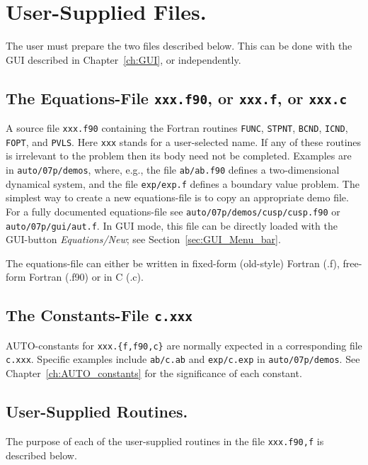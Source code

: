 \documentclass[12pt]{report}
\begin{document}
\chapter{ User-Supplied Files.} \label{ch:User_supplied_files}
The user must prepare the two files described below.
This can be done with the GUI described in Chapter~\ref{ch:GUI}, 
or independently.

\section{ The Equations-File {\tt xxx.f90}, or {\tt xxx.f}, or {\tt xxx.c}} 
A source file {\tt xxx.f90} containing the Fortran routines
{\tt FUNC}, {\tt STPNT}, {\tt BCND}, {\tt ICND}, {\tt FOPT}, and {\tt PVLS}.
Here {\tt xxx} stands for a user-selected name. 
If any of these routines is irrelevant 
to the problem then its body need not be completed.
Examples are in {\tt auto/07p/demos}, where, e.g.,
the file {\tt ab/ab.f90} defines a two-dimensional dynamical system,
and the file {\tt exp/exp.f} defines a boundary value problem.
The simplest way to create a new equations-file is to copy 
an appropriate demo file.
For a fully documented equations-file see
{\tt auto/07p/demos/cusp/cusp.f90} or {\tt auto/07p/gui/aut.f}.
In GUI mode, this file can be directly loaded with the GUI-button 
{\it Equations/New}; see Section~\ref{sec:GUI_Menu_bar}.
 
The equations-file can either be written in fixed-form (old-style)
Fortran (.f), free-form Fortran (.f90) or in C (.c).

\section{ The Constants-File {\tt c.xxx}} 
{\cal AUTO}-constants for {\tt xxx.\{f,f90,c\}} are normally expected 
in a corresponding file {\tt c.xxx}.
Specific examples include {\tt ab/c.ab}
and {\tt exp/c.exp} in {\tt auto/07p/demos}.
See Chapter~\ref{ch:AUTO_constants}
for the significance of each constant.

\newpage
\section{ User-Supplied Routines.} \label{sec: User_supplied_routines}
The purpose of each of the user-supplied routines in
the file {\tt xxx.{f90,f}} is described below.
  
\end{document}
